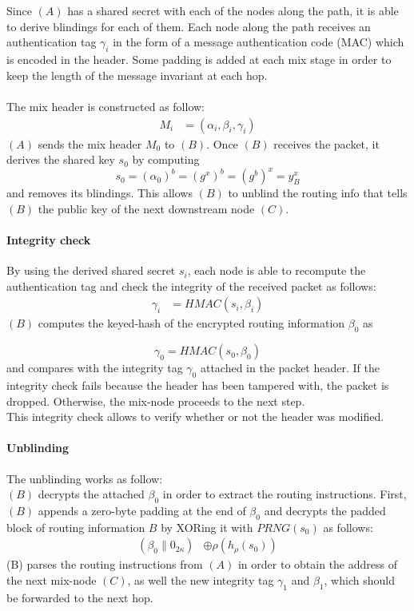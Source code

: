     \\~\\Since $(A)$ has a shared secret with each of the nodes along the path, it is able to derive blindings for each of them.
    \newline Each node along the path receives an authentication tag $\gamma_i$ in the form of a message authentication code (MAC)
which is encoded in the header.
\newline Some padding is added at each mix stage in order to keep the length of the message invariant at each hop.
\\~\\The mix header is constructed as follow: 
\begin{align}  
    M_i&=(\alpha_i,\beta_i,\gamma_i)
\end{align}
\newline $(A)$ sends the mix header $M_0$ to $(B)$. Once $(B)$ receives the packet, it derives the shared key $s_0$ by computing $$s_0=(\alpha_0)^b=(g^x)^b=(g^b)^x=y^x_B$$
and removes its blindings. This allows $(B)$ to unblind the routing info that tells $(B)$ the public key of the next downstream node $(C)$.
\paragraph{Integrity check}
By using the derived shared secret $s_i$, each node is able to recompute the authentication tag and check the integrity of the received packet as follows: 
\begin{align}  
    \gamma_i&=HMAC(s_i,\beta_i)
\end{align} 
$(B)$ computes the keyed-hash of the encrypted routing information $\beta_0$ as 
 
    $$\gamma_0=HMAC(s_0,\beta_0)$$
and compares with the integrity tag $\gamma_0$ attached in the packet header. If the integrity check fails because the header has been tampered with, the packet is dropped. Otherwise, the mix-node proceeds to the next step.
\\This integrity check allows to verify whether or not the header was modified.

\paragraph{Unblinding}
The unblinding works as follow:
\\$(B)$ decrypts the attached $\beta_0$ in order to extract the routing instructions. First, $(B)$ appends a zero-byte padding at the end of $\beta_0$ and decrypts the padded block of routing information $B$ by XORing it with $PRNG(s_{0})$ as follows:
\begin{align}  
    (\beta_0\|0_{2\kappa})&\oplus \rho(h_{\rho}(s_{0}))
\end{align}
(B) parses the routing instructions from $(A)$ in order to obtain the address of the next mix-node $(C)$, as well the new integrity tag $\gamma_1$ and $\beta_1$, which should be forwarded to the next hop.
